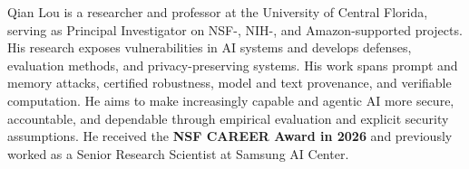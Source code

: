 Qian Lou is a researcher and professor at the University of Central Florida, serving as Principal Investigator on NSF-, NIH-, and Amazon-supported projects. His research exposes vulnerabilities in AI systems and develops defenses, evaluation methods, and privacy-preserving systems. His work spans prompt and memory attacks, certified robustness, model and text provenance, and verifiable computation. He aims to make increasingly capable and agentic AI more secure, accountable, and dependable through empirical evaluation and explicit security assumptions. He received the \textbf{NSF CAREER Award in 2026} and previously worked as a Senior Research Scientist at Samsung AI Center.
